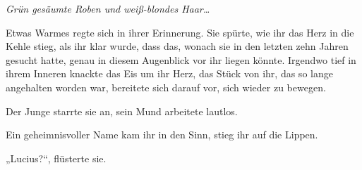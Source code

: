 \emph{Grün gesäumte Roben und weiß-blondes Haar…}

Etwas Warmes regte sich in ihrer Erinnerung. Sie spürte, wie ihr das Herz in die Kehle stieg, als ihr klar wurde, dass das, wonach sie in den letzten zehn Jahren gesucht hatte, genau in diesem Augenblick vor ihr liegen könnte. Irgendwo tief in ihrem Inneren knackte das Eis um ihr Herz, das Stück von ihr, das so lange angehalten worden war, bereitete sich darauf vor, sich wieder zu bewegen.

Der Junge starrte sie an, sein Mund arbeitete lautlos.

Ein geheimnisvoller Name kam ihr in den Sinn, stieg ihr auf die Lippen.

„Lucius?“, flüsterte sie.


